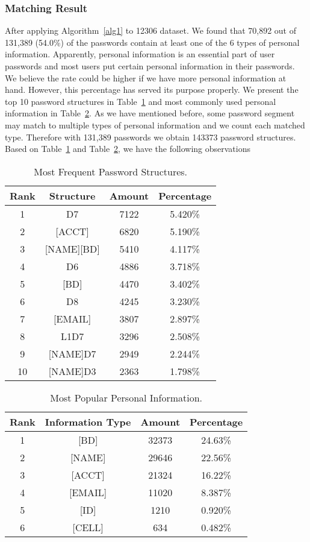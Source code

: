 \subsubsection{Matching Result}
\label{matchingresult}
After applying Algorithm~\ref{alg1} to 12306 dataset. We found that 70,892 out of 131,389 (54.0\%) of the passwords contain at least one of the 6 types of personal information. Apparently, personal information is an essential part of user passwords and most users put certain personal information in their passwords. We believe the rate could be higher if we have more personal information at hand. However, this percentage has served its purpose properly. We present the top 10 password structures in Table~\ref{t3} and most commonly used personal information in Table~\ref{t4}. As we have mentioned before, some password segment may match to multiple types of personal information and we count each matched type. Therefore with 131,389 passwords we obtain 143373 password structures. Based on Table~\ref{t3} and Table~\ref{t4}, we have the following observations

\begin{table}
\centering
\caption{Most Frequent Password Structures.}
\begin{tabular}{|c|c|c|c|} \hline
Rank&Structure&Amount&Percentage\\ \hline
1&D7&7122&5.420\% \\
2&[ACCT]&6820&5.190\% \\
3&[NAME][BD]&5410&4.117\% \\
4&D6&4886&3.718\% \\
5&[BD]&4470&3.402\% \\
6&D8&4245&3.230\% \\
7&[EMAIL]&3807&2.897\% \\
8&L1D7&3296&2.508\% \\
9&[NAME]D7&2949&2.244\% \\
10&[NAME]D3&2363&1.798\% \\
\hline\end{tabular}
\label{t3}
\end{table}

\begin{table}
\centering
\caption{Most Popular Personal Information.}
\begin{tabular}{|c|c|c|c|} \hline
Rank&Information Type&Amount&Percentage\\ \hline
1&[BD]&32373&24.63\%\\
2&[NAME]&29646&22.56\%\\
3&[ACCT]&21324&16.22\%\\
4&[EMAIL]&11020&8.387\%\\
5&[ID]&1210&0.920\%\\
6&[CELL]&634&0.482\%\\
\hline\end{tabular}
\label{t4}
\end{table}

